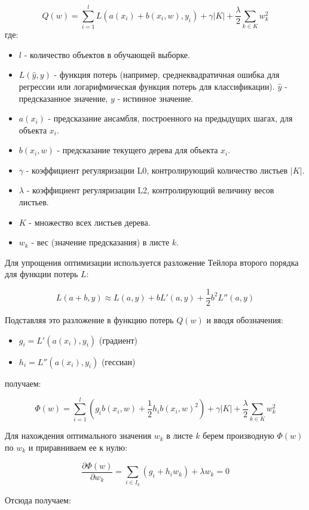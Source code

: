 \[
    Q(w) = \sum_{i=1}^l L(a(x_i) + b(x_i, w), y_i) + \gamma|K| + \frac{\lambda}{2} \sum_{k \in K} w_k^2
\]
где:

\begin{itemize}
    \item $l$ - количество объектов в обучающей выборке.
    \item $L(\hat{y}, y)$ - функция потерь (например, среднеквадратичная ошибка для регрессии или логарифмическая функция потерь для классификации).  $\hat{y}$ - предсказанное значение, $y$ - истинное значение.
    \item $a(x_i)$ - предсказание ансамбля, построенного на предыдущих шагах, для объекта $x_i$.
    \item $b(x_i, w)$ - предсказание текущего дерева для объекта $x_i$.
    \item $\gamma$ - коэффициент регуляризации L0, контролирующий количество листьев $|K|$.
    \item $\lambda$ - коэффициент регуляризации L2, контролирующий величину весов листьев.
    \item $K$ - множество всех листьев дерева.
    \item $w_k$ - вес (значение предсказания) в листе $k$.
\end{itemize}

Для упрощения оптимизации используется разложение Тейлора второго порядка для функции потерь $L$:

\[
    L(a + b, y) \approx L(a, y) + bL'(a, y) + \frac{1}{2} b^2 L''(a, y)
\]

Подставляя это разложение в функцию потерь $Q(w)$ и вводя обозначения:

\begin{itemize}
    \item $g_i = L'(a(x_i), y_i)$ (градиент)
    \item $h_i = L''(a(x_i), y_i)$ (гессиан)
\end{itemize}

получаем:

\[
    \Phi(w) =  \sum_{i=1}^l \left(g_i b(x_i, w) + \frac{1}{2} h_i b(x_i, w)^2\right) + \gamma|K| + \frac{\lambda}{2} \sum_{k \in K} w_k^2
\]


Для нахождения оптимального значения $w_k$ в листе $k$ берем производную $\Phi(w)$ по $w_k$ и приравниваем ее к нулю:

\[
    \frac{\partial \Phi(w)}{\partial w_k} = \sum_{i \in I_k} (g_i + h_i w_k) + \lambda w_k = 0
\]

Отсюда получаем:

